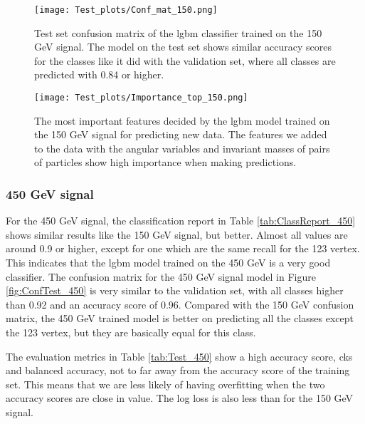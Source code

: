 \documentclass[a4paper, american, 12pt]{report}
\begin{document}
	\begin{figure}[htb!]
		\centering\texttt{[image: Test\_plots/Conf\_mat\_150.png]}
		\caption[Test set confusion matrix for the \acrshort{lgbm} model trained on the 150 GeV signal.]{Test set confusion matrix of the \acrshort{lgbm} classifier trained on the 150 GeV signal. The model on the test set shows similar accuracy scores for the classes like it did with the validation set, where all classes are predicted with 0.84 or higher. \label{fig:ConfTest_150}}
	\end{figure}

	\begin{figure}[htb!]
		\centering\texttt{[image: Test\_plots/Importance\_top\_150.png]}
		\caption[Test set most important features of the \acrshort{lgbm} model trained on the 150 GeV signal.]{The most important features decided by the \acrshort{lgbm} model trained on the 150 GeV signal for predicting new data. The features we added to the data with the angular variables and invariant masses of pairs of particles show high importance when making predictions. \label{fig:ImpTop_150}}
	\end{figure}
	
	\newpage
	\subsubsection{450 GeV signal}
	\label{subsect:Result-Test450}
	For the 450 GeV signal, the classification report in Table \ref{tab:ClassReport_450} shows similar results like the 150 GeV signal, but better. Almost all values are around 0.9 or higher, except for one which are the same recall for the 123 vertex. This indicates that the \acrshort{lgbm} model trained on the 450 GeV is a very good classifier. The confusion matrix for the 450 GeV signal model in Figure \ref{fig:ConfTest_450} is very similar to the validation set, with all classes higher than 0.92 and an accuracy score of 0.96. Compared with the 150 GeV confusion matrix, the 450 GeV trained model is better on predicting all the classes except the 123 vertex, but they are basically equal for this class.
	
	The evaluation metrics in Table \ref{tab:Test_450} show a high accuracy score, \acrshort{cks} and balanced accuracy, not to far away from the accuracy score of the training set. This means that we are less likely of having overfitting when the two accuracy scores are close in value. The log loss is also less than for the 150 GeV signal.
	
\end{document}
